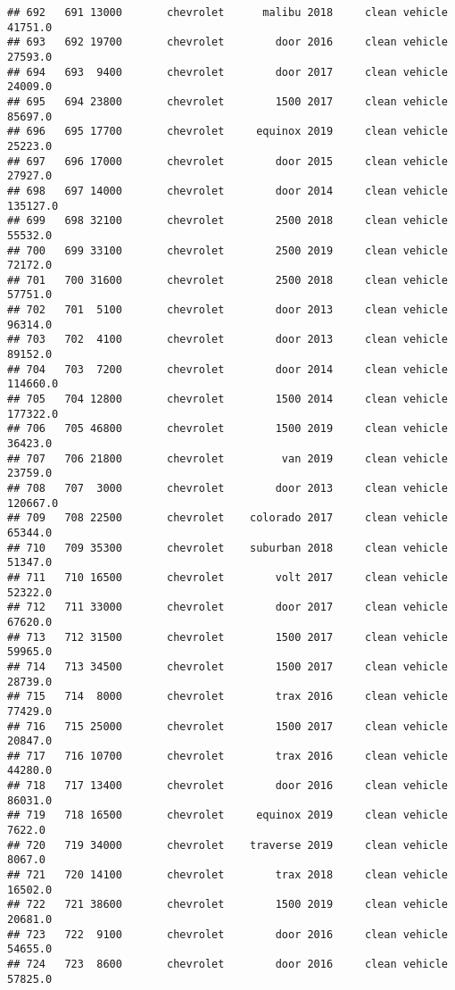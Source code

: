 \documentclass[
]{article}
\begin{document}
\begin{verbatim}
## 692   691 13000       chevrolet      malibu 2018     clean vehicle   41751.0
## 693   692 19700       chevrolet        door 2016     clean vehicle   27593.0
## 694   693  9400       chevrolet        door 2017     clean vehicle   24009.0
## 695   694 23800       chevrolet        1500 2017     clean vehicle   85697.0
## 696   695 17700       chevrolet     equinox 2019     clean vehicle   25223.0
## 697   696 17000       chevrolet        door 2015     clean vehicle   27927.0
## 698   697 14000       chevrolet        door 2014     clean vehicle  135127.0
## 699   698 32100       chevrolet        2500 2018     clean vehicle   55532.0
## 700   699 33100       chevrolet        2500 2019     clean vehicle   72172.0
## 701   700 31600       chevrolet        2500 2018     clean vehicle   57751.0
## 702   701  5100       chevrolet        door 2013     clean vehicle   96314.0
## 703   702  4100       chevrolet        door 2013     clean vehicle   89152.0
## 704   703  7200       chevrolet        door 2014     clean vehicle  114660.0
## 705   704 12800       chevrolet        1500 2014     clean vehicle  177322.0
## 706   705 46800       chevrolet        1500 2019     clean vehicle   36423.0
## 707   706 21800       chevrolet         van 2019     clean vehicle   23759.0
## 708   707  3000       chevrolet        door 2013     clean vehicle  120667.0
## 709   708 22500       chevrolet    colorado 2017     clean vehicle   65344.0
## 710   709 35300       chevrolet    suburban 2018     clean vehicle   51347.0
## 711   710 16500       chevrolet        volt 2017     clean vehicle   52322.0
## 712   711 33000       chevrolet        door 2017     clean vehicle   67620.0
## 713   712 31500       chevrolet        1500 2017     clean vehicle   59965.0
## 714   713 34500       chevrolet        1500 2017     clean vehicle   28739.0
## 715   714  8000       chevrolet        trax 2016     clean vehicle   77429.0
## 716   715 25000       chevrolet        1500 2017     clean vehicle   20847.0
## 717   716 10700       chevrolet        trax 2016     clean vehicle   44280.0
## 718   717 13400       chevrolet        door 2016     clean vehicle   86031.0
## 719   718 16500       chevrolet     equinox 2019     clean vehicle    7622.0
## 720   719 34000       chevrolet    traverse 2019     clean vehicle    8067.0
## 721   720 14100       chevrolet        trax 2018     clean vehicle   16502.0
## 722   721 38600       chevrolet        1500 2019     clean vehicle   20681.0
## 723   722  9100       chevrolet        door 2016     clean vehicle   54655.0
## 724   723  8600       chevrolet        door 2016     clean vehicle   57825.0

\end{verbatim}
\end{document}
